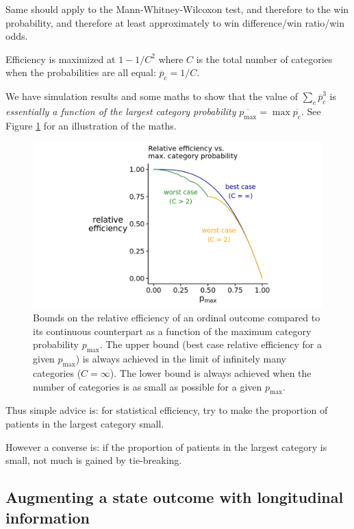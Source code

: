 \documentclass[
  11pt,
  fleqn
]{article}
\begin{document}
Same should apply to the Mann-Whitney-Wilcoxon test, and therefore to
the win probability, and therefore at least approximately to win
difference/win ratio/win odds.

Efficiency is maximized at $1 - 1/C^2$ where $C$ is the total number of
categories when the probabilities are all equal: $\overline p_c = 1/C$.

We have simulation results and some maths to show that the value of $\sum_c
\overline p_c^3$ is \emph{essentially a function of the largest category
probability} $\overline{p_{\max}} = \max \overline{p_c}$. See Figure
\ref{fig:p_max} for an illustration of the maths.

\begin{figure}
  \includegraphics[width=6in]{p_max_controls_efficiency.png}
  \caption{Bounds on the relative efficiency of an ordinal outcome
    compared to its continuous counterpart as a function of the maximum
    category probability $p_\text{max}$. The upper bound (best case
    relative efficiency for a given $p_\text{max}$) is always achieved in the
    limit of infinitely many categories ($C = \infty$). The lower bound
    is always achieved when the number of categories is as small as
  possible for a given $p_\text{max}$.}
  \label{fig:p_max}
\end{figure}

Thus simple advice is: for statistical efficiency, try to make the proportion
of patients in the largest category small.

However a converse is: if the proportion of patients in the largest
category is
small, not much is gained by tie-breaking.

\subsection{Augmenting a state outcome with longitudinal
information}
\end{document}
